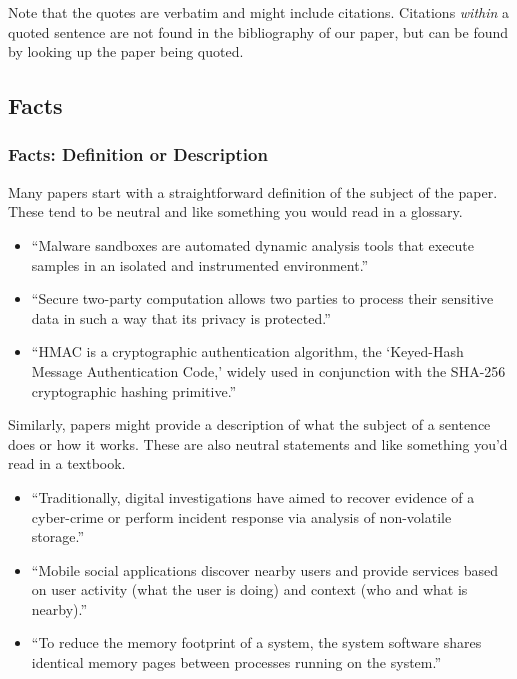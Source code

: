 \documentclass[sigconf,anonymous]{acmart}
\begin{document}
	Note that the quotes are verbatim and might include citations. Citations \textit{within} a quoted sentence are not found in the bibliography of our paper, but can be found by looking up the paper being quoted.  


	\subsection{Facts}
	\subsubsection{Facts: Definition or Description}

	Many papers start with a straightforward definition of the subject of the paper. These tend to be neutral and like something you would read in a glossary.

	\begin{itemize}

		\item	``Malware sandboxes are automated dynamic analysis tools that execute samples in an isolated and instrumented environment.''~\cite{graziano2015needles}

		\item	``Secure two-party computation allows two parties to process their sensitive data in such a way that its privacy is protected.''~\cite{demmler2014}

		\item	``HMAC is a cryptographic authentication algorithm, the ‘Keyed-Hash Message Authentication Code,’ widely used in conjunction with the SHA-256 cryptographic hashing primitive.''~\cite{beringer2015verified}

	\end{itemize}

	Similarly, papers might provide a description of what the subject of a sentence does or how it works. These are also neutral statements and like something you’d read in a textbook.

	\begin{itemize}

		\item	``Traditionally, digital investigations have aimed to recover evidence of a cyber-crime or perform incident response via analysis of non-volatile storage.''~\cite{saltaformaggio2014dscrete}

		\item	``Mobile social applications discover nearby users and provide services based on user activity (what the user is doing) and context (who and what is nearby).''~\cite{lentz2014sddr}

		\item	``To reduce the memory footprint of a system, the system software shares identical memory pages between processes running on the system.''~\cite{yarom2014flush+}
	\end{itemize}
\end{document}
